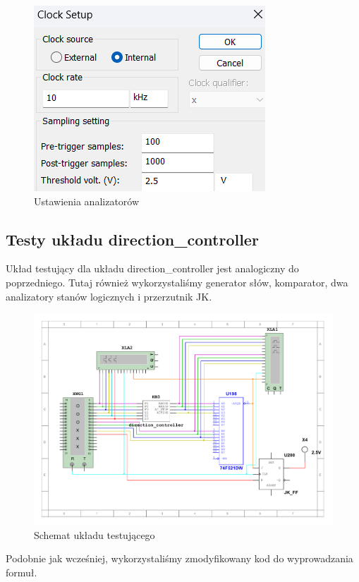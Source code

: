 \documentclass[a4paper]{article}
\begin{document}
\begin{figure}[H]
    \centering
    \includegraphics{direction_controller_test_logic_analizer_settings.png}
    \caption{Ustawienia analizatorów}
\end{figure}

\subsection{Testy układu direction\_controller}
Układ testujący dla układu direction\_controller jest analogiczny do poprzedniego.
Tutaj również wykorzystaliśmy generator słów, komparator, dwa analizatory stanów logicznych
i przerzutnik JK. 

\begin{figure}[H]
    \centering
    \includegraphics[width=\textwidth]{component_test_direction_controller.pdf}
    \caption{Schemat układu testującego}
\end{figure}

Podobnie jak wcześniej, wykorzystaliśmy zmodyfikowany kod do wyprowadzania formuł.
\end{document}
